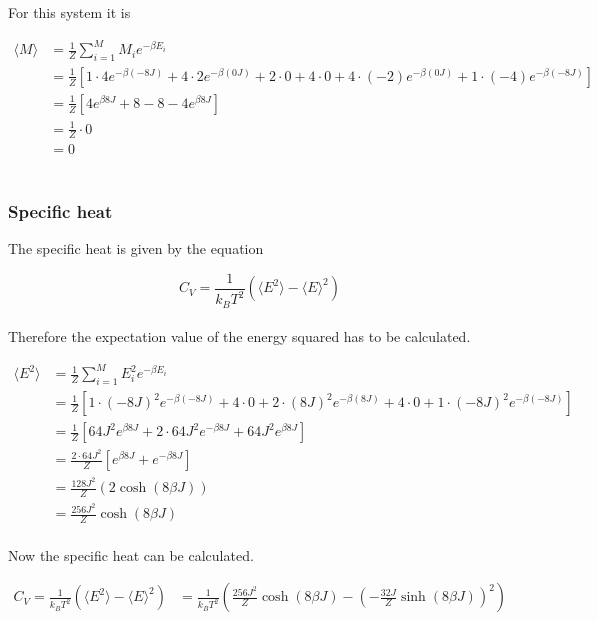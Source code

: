 \documentclass{article}
\begin{document}
For this system it is

\begin{align*}
  \langle M \rangle &= \frac{1}{Z} \sum _{i=1} ^M M_i e^{- \beta E_i} \\
  &= \frac{1}{Z} \left[1 \cdot 4 e^{- \beta (-8J)} + 4 \cdot 2 e^{- \beta (0J)} + 2 \cdot 0 + 4 \cdot 0 + 4 \cdot (-2) e^{- \beta (0J)} + 1 \cdot (-4) e^{- \beta (-8J)} \right] \\
  &= \frac{1}{Z} \left[ 4 e^{\beta 8J} + 8 - 8 - 4 e^{ \beta 8J} \right] \\
  &= \frac{1}{Z} \cdot 0 \\
  &= 0
\end{align*} \\


\subsubsection{Specific heat}

The specific heat is given by the equation

\begin{equation}    \label{eq:specificheat}
    C_V = \frac{1}{k_B T^2} \left( \langle E^2 \rangle - \langle E \rangle ^2 \right)
\end{equation} \\

Therefore the expectation value of the energy squared has to be calculated.

\begin{align*}
  \langle E^2 \rangle &= \frac{1}{Z} \sum _{i=1} ^M E_i^2 e^{- \beta E_i} \\
  &= \frac{1}{Z} \left[ 1 \cdot (-8J)^2 e^{- \beta (-8J)} + 4 \cdot 0 + 2 \cdot (8J)^2 e^{- \beta (8J)} + 4 \cdot 0 + 1 \cdot (-8J)^2 e^{- \beta (-8J)} \right] \\
  &= \frac{1}{Z} \left[ 64 J^2 e^{\beta 8J} + 2 \cdot 64 J^2 e^{- \beta 8J} + 64 J^2 e^{ \beta 8J} \right] \\
  &= \frac{2 \cdot 64 J^2}{Z} \left[ e^{\beta 8 J} + e^{- \beta 8 J} \right] \\
  &= \frac{128 J^2}{Z} (2 \cosh(8 \beta J) ) \\
  &= \frac{256 J^2}{Z} \cosh(8 \beta J)
\end{align*} \\

Now the specific heat can be calculated.

\begin{align*}
    C_V = \frac{1}{k_B T^2} \left( \langle E^2 \rangle - \langle E \rangle ^2 \right)
    &= \frac{1}{k_B T^2} \left( \frac{256 J^2}{Z} \cosh (8 \beta J) - \left( - \frac{32 J}{Z} \sinh(8 \beta J ) \right) ^2 \right)
\end{align*} \\
\end{document}
